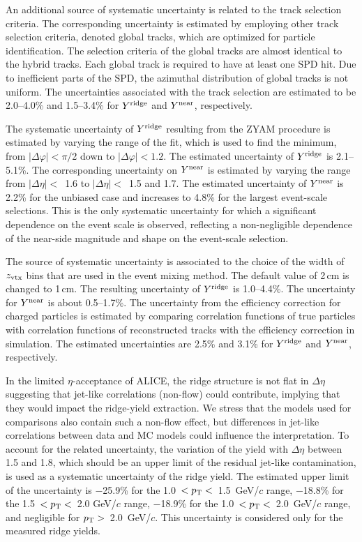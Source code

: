 An additional source of systematic uncertainty is related to the track selection criteria. The corresponding uncertainty is estimated by employing other track selection criteria, denoted global tracks, which are optimized for particle identification. The selection criteria of the global tracks are almost identical to the hybrid tracks. Each global track is required to have at least one SPD hit. Due to inefficient parts of the SPD, the azimuthal distribution of global tracks is not uniform.
The uncertainties associated with the track selection are estimated to be 2.0--4.0\% and 1.5--3.4\% for $Y^{\rm{ridge}}$ and $Y^{\rm{near}}$, respectively.

The systematic uncertainty of $Y^{\rm{ridge}}$ resulting from the ZYAM procedure is estimated by varying the range of the fit, which is used to find the minimum, from $|\Delta\varphi|<\pi/$2 down to $|\Delta\varphi|<1.2$. The estimated uncertainty of $Y^{\rm{ridge}}$ is 2.1--5.1\%. The corresponding uncertainty on $Y^{\rm{near}}$ is estimated by varying the range from $|\Delta\eta|<$~1.6 to $|\Delta\eta|<$~1.5 and 1.7. The estimated uncertainty of $Y^{\rm{near}}$ is 2.2\% for the unbiased case and increases to 4.8\% for the largest event-scale selections. This is the only systematic uncertainty for which a significant dependence on the event scale is observed, reflecting a non-negligible dependence of the near-side magnitude and shape on the event-scale selection.

The source of systematic uncertainty is associated to the choice of the width of $z_{\rm vtx}$ bins that are used in the event mixing method. The default value of 2\,cm is changed to 1\,cm. The resulting uncertainty of $Y^{\rm{ridge}}$ is 1.0--4.4\%.
The uncertainty for $Y^{\rm{near}}$ is about 0.5--1.7\%. The uncertainty from the efficiency correction for charged particles is estimated by comparing correlation functions of true particles with correlation functions of reconstructed tracks with the efficiency correction in simulation. The estimated uncertainties are 2.5\% and 3.1\% for $Y^{\rm{ridge}}$ and $Y^{\rm{near}}$, respectively. 

In the limited $\eta$-acceptance of ALICE, the ridge structure is not flat in $\Delta\eta$ suggesting that jet-like correlations (non-flow) could contribute, implying that they would impact the ridge-yield extraction. We stress that the models used for comparisons also contain such a non-flow effect, but differences in jet-like correlations between data and MC models could influence the interpretation. To account for the related uncertainty, the variation of the yield with $\Delta\eta$ between 1.5 and 1.8, which should be an upper limit of the residual jet-like contamination, is used as a systematic uncertainty of the ridge yield. The estimated upper limit of the uncertainty is $-$25.9\% for the 1.0~$<p_\mathrm{T}<$~1.5~GeV/$c$ range,  $-$18.8\% for the 1.5~$<p_\mathrm{T}<$~2.0 GeV/$c$ range,  $-$18.9\% for the 1.0~$<p_\mathrm{T}<$~2.0~GeV/$c$ range, and negligible for $p_\mathrm{T}>$~2.0~GeV/$c$. This uncertainty is considered only for the measured ridge yields.
